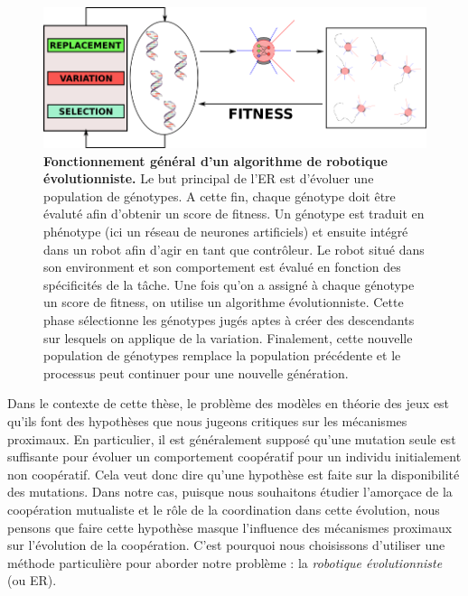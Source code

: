     \begin{figure}[hbt]
        \begin{center}
          \includegraphics[scale = 0.50]{fig/Intro/EvolutionaryRobotics.png}
          \caption{\textbf{Fonctionnement général d'un algorithme de robotique évolutionniste.}
          Le but principal de l'ER est d'évoluer une population de génotypes. A cette fin, chaque génotype doit être évaluté afin d'obtenir un score de fitness. Un génotype est traduit en phénotype (ici un réseau de neurones artificiels) et ensuite intégré dans un robot afin d'agir en tant que contrôleur. Le robot situé dans son environment et son comportement est évalué en fonction des spécificités de la tâche. Une fois qu'on a assigné à chaque génotype un score de fitness, on utilise un algorithme évolutionniste. Cette phase sélectionne les génotypes jugés aptes à créer des descendants sur lesquels on applique de la variation. Finalement, cette nouvelle population de génotypes remplace la population précédente et le processus peut continuer pour une nouvelle génération.} 
          \label{fig:EvolutionaryRobotics}
        \end{center}
    \end{figure}

    Dans le contexte de cette thèse, le problème des modèles en théorie des jeux est qu'ils font des hypothèses que nous jugeons critiques sur les mécanismes proximaux. En particulier, il est généralement supposé qu'une mutation seule est suffisante pour évoluer un comportement coopératif pour un individu initialement non coopératif. Cela veut donc dire qu'une hypothèse est faite sur la disponibilité des mutations. Dans notre cas, puisque nous souhaitons étudier l'amorçace de la coopération mutualiste et le rôle de la coordination dans cette évolution, nous pensons que faire cette hypothèse masque l'influence des mécanismes proximaux sur l'évolution de la coopération. C'est pourquoi nous choisissons d'utiliser une méthode particulière pour aborder notre problème : la \emph{robotique évolutionniste} (ou ER).


